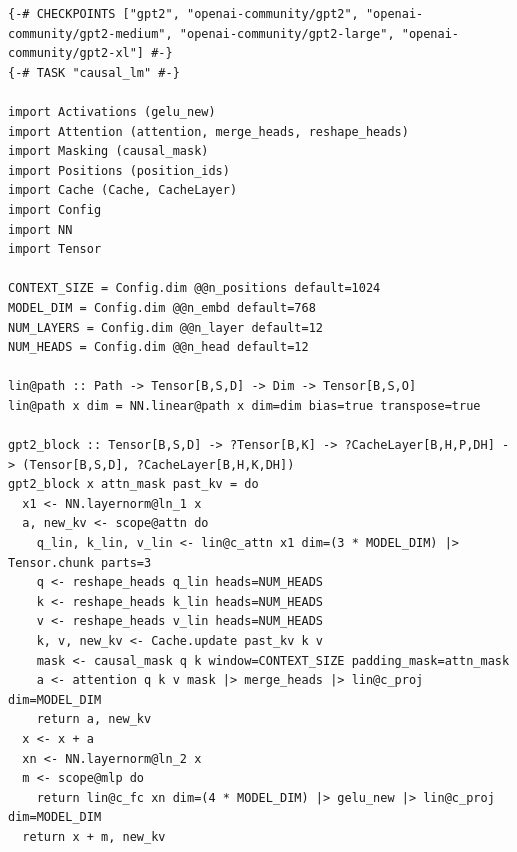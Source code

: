 \documentclass{article}
\begin{document}
\begin{tcolorbox}[posterbox,title={Full GPT-2 KV Axon Model}]
\begin{minipage}[t]{0.66\linewidth}
\vspace{0pt}
\begin{tcolorbox}[codebox]
\begin{lstlisting}[basicstyle=\ttfamily\fontsize{18.4}{19.8}\selectfont]
{-# CHECKPOINTS ["gpt2", "openai-community/gpt2", "openai-community/gpt2-medium", "openai-community/gpt2-large", "openai-community/gpt2-xl"] #-}
{-# TASK "causal_lm" #-}

import Activations (gelu_new)
import Attention (attention, merge_heads, reshape_heads)
import Masking (causal_mask)
import Positions (position_ids)
import Cache (Cache, CacheLayer)
import Config
import NN
import Tensor

CONTEXT_SIZE = Config.dim @@n_positions default=1024
MODEL_DIM = Config.dim @@n_embd default=768
NUM_LAYERS = Config.dim @@n_layer default=12
NUM_HEADS = Config.dim @@n_head default=12

lin@path :: Path -> Tensor[B,S,D] -> Dim -> Tensor[B,S,O]
lin@path x dim = NN.linear@path x dim=dim bias=true transpose=true

gpt2_block :: Tensor[B,S,D] -> ?Tensor[B,K] -> ?CacheLayer[B,H,P,DH] -> (Tensor[B,S,D], ?CacheLayer[B,H,K,DH])
gpt2_block x attn_mask past_kv = do
  x1 <- NN.layernorm@ln_1 x
  a, new_kv <- scope@attn do
    q_lin, k_lin, v_lin <- lin@c_attn x1 dim=(3 * MODEL_DIM) |> Tensor.chunk parts=3
    q <- reshape_heads q_lin heads=NUM_HEADS
    k <- reshape_heads k_lin heads=NUM_HEADS
    v <- reshape_heads v_lin heads=NUM_HEADS
    k, v, new_kv <- Cache.update past_kv k v
    mask <- causal_mask q k window=CONTEXT_SIZE padding_mask=attn_mask
    a <- attention q k v mask |> merge_heads |> lin@c_proj dim=MODEL_DIM
    return a, new_kv
  x <- x + a
  xn <- NN.layernorm@ln_2 x
  m <- scope@mlp do
    return lin@c_fc xn dim=(4 * MODEL_DIM) |> gelu_new |> lin@c_proj dim=MODEL_DIM
  return x + m, new_kv


\end{lstlisting}
\end{tcolorbox}
\end{minipage}
\end{tcolorbox}
\end{document}
